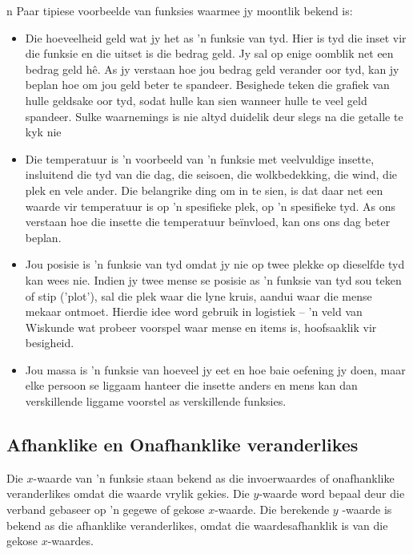 n Paar tipiese voorbeelde van funksies waarmee jy moontlik bekend is:\par 
\begin{itemize}[noitemsep]
\item Die hoeveelheid geld wat jy het as ’n funksie van tyd. Hier is tyd die inset vir die funksie en die uitset is die bedrag geld. Jy sal op
enige oomblik net een bedrag geld hê. As jy verstaan hoe jou bedrag geld verander oor tyd, kan jy beplan hoe om jou
geld beter te spandeer. Besighede teken die grafiek van hulle geldsake oor tyd, sodat hulle kan sien wanneer hulle te
veel geld spandeer. Sulke waarnemings is nie altyd duidelik deur slegs na die getalle te kyk nie
\item Die temperatuur is ’n voorbeeld van ’n funksie met veelvuldige insette, insluitend die tyd van die dag, die seisoen, die
wolkbedekking, die wind, die plek en vele ander. Die belangrike ding om in te sien, is dat daar net een waarde vir
temperatuur is op ’n spesifieke plek, op ’n spesifieke tyd. As ons verstaan hoe die insette die temperatuur beïnvloed,
kan ons ons dag beter beplan.
\item Jou posisie is ’n funksie van tyd omdat jy nie op twee plekke op dieselfde tyd kan wees nie. Indien jy twee mense se
posisie as ’n funksie van tyd sou teken of stip (’plot’), sal die plek waar die lyne kruis, aandui waar die mense mekaar
ontmoet. Hierdie idee word gebruik in logistiek – ’n veld van Wiskunde wat probeer voorspel waar mense en items is,
hoofsaaklik vir besigheid.
\item Jou massa is ’n funksie van hoeveel jy eet en hoe baie oefening jy doen, maar elke persoon se liggaam hanteer die
insette anders en mens kan dan verskillende liggame voorstel as verskillende funksies.
\end{itemize}





\subsection*{Afhanklike en Onafhanklike veranderlikes}
Die $x$-waarde van 'n funksie staan bekend as die invoerwaardes of onafhanklike veranderlikes omdat die waarde vrylik gekies. Die $y$-waarde
word bepaal deur die verband gebaseer op ’n gegewe of gekose $x$-waarde. Die berekende $y$ -waarde is bekend as die afhanklike veranderlikes, omdat die waardesafhanklik is van die gekose $x$-waardes.\par 

